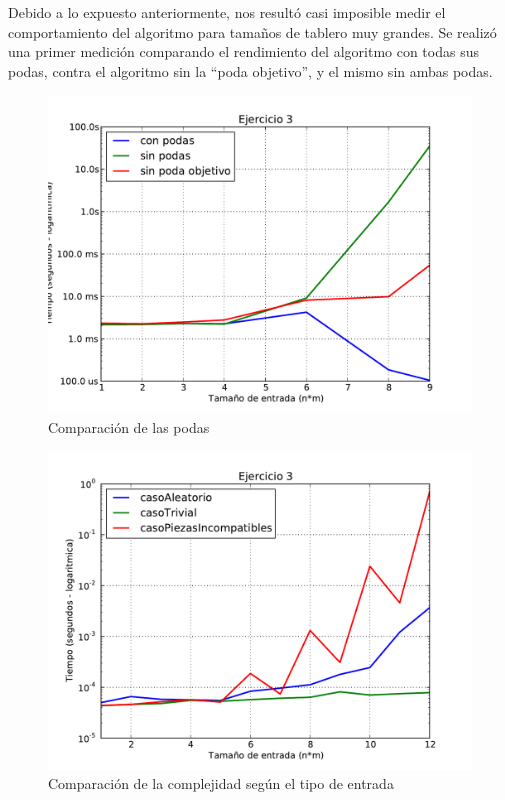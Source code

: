 \documentclass[11pt, a4paper, twoside]{article}
\begin{document}
Debido a lo expuesto anteriormente, nos resultó casi imposible medir el
comportamiento del algoritmo para tamaños de tablero muy grandes. Se realizó una
primer medición comparando el rendimiento del algoritmo con todas sus podas,
contra el algoritmo sin la ``poda objetivo'', y el mismo sin ambas podas.


\begin{figure}[H]
   \begin{center}
   \includegraphics[width=1\textwidth,angle=0]{../ej3/graficos/test_sinPodas.pdf}
   \caption{Comparación de las podas}
   \label{fig:ej3-1}
   \end{center}
\end{figure}

\begin{figure}[H]
   \begin{center}
   \includegraphics[width=1\textwidth,angle=0]{../ej3/graficos/test_exponencial.pdf}
   \caption{Comparación de la complejidad según el tipo de entrada}
   \label{fig:ej3-2}
   \end{center}
\end{figure}
\end{document}

